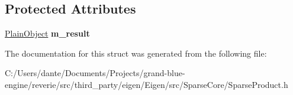 \subsection*{Protected Attributes}
\begin{DoxyCompactItemize}
\item 
\mbox{\label{struct_eigen_1_1internal_1_1unary__evaluator_3_01_sparse_view_3_01_product_3_01_lhs_00_01_rhs_00009027121becdbd7ae7cc0d8a4c63ed7_ad5fce295f56e535fc51a841ea7c7bf0d}} 
\mbox{\hyperlink{class_eigen_1_1_sparse_matrix}{Plain\+Object}} {\bfseries m\+\_\+result}
\end{DoxyCompactItemize}


The documentation for this struct was generated from the following file\+:\begin{DoxyCompactItemize}
\item 
C\+:/\+Users/dante/\+Documents/\+Projects/grand-\/blue-\/engine/reverie/src/third\+\_\+party/eigen/\+Eigen/src/\+Sparse\+Core/Sparse\+Product.\+h\end{DoxyCompactItemize}
